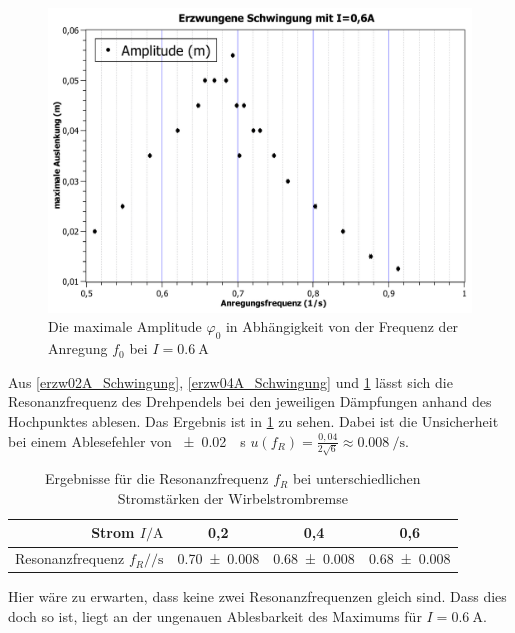 \documentclass[
	a4paper,
	12pt,
	pagesize,
	ngerman
]{scrartcl}
\begin{document}
	\begin{figure}[H]
		\includegraphics[width=1\textwidth]{erzwungene_Schwingung_0,6A}
		\centering
		\caption{Die maximale Amplitude $ \varphi_0 $ in Abhängigkeit von der Frequenz der Anregung $ f_0 $  bei $I=\SI{0,6}{\ampere}$}
		\label{erzw06A_Schwingung}
		\centering
	\end{figure}
	Aus \cref{erzw02A_Schwingung}, \cref{erzw04A_Schwingung} und \cref{erzw06A_Schwingung} lässt sich die Resonanzfrequenz des Drehpendels bei den jeweiligen Dämpfungen anhand des Hochpunktes ablesen. Das Ergebnis ist in \cref{erzwTab} zu sehen. Dabei ist die Unsicherheit bei einem Ablesefehler von \SI{\pm 0,02}{\per \second} $u(f_R)=\frac{0,04}{2\sqrt{6}} \approx \SI{0,008}{\per \second}$. 
	\begin{table}[htb]
		\centering
		\begin{tabular}{ r | c | c | c |}
			Strom $I /\si{\ampere}$& 0,2 & 0,4 & 0,6\\ \hline
			Resonanzfrequenz $ f_R / \si{\per \second}$& \num{0,70 \pm 0,008} & \num{0,68 \pm 0,008} & \num{0,68 \pm 0,008}
		\end{tabular}
		\caption{Ergebnisse für die Resonanzfrequenz $ f_R $ bei unterschiedlichen Stromstärken der Wirbelstrombremse}
		\label{erzwTab}
	\end{table}
	Hier wäre zu erwarten, dass keine zwei Resonanzfrequenzen gleich sind. Dass dies doch so ist, liegt an der ungenauen Ablesbarkeit des Maximums für $I = \SI{0,6}{\ampere}$.
	
\end{document}
